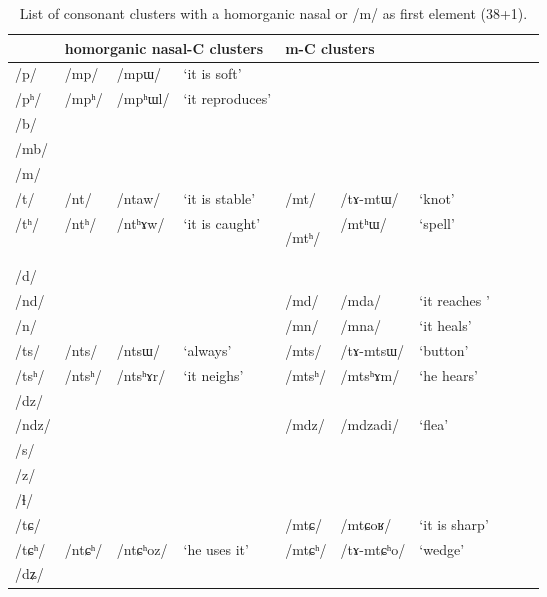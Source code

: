 \documentclass[12pt]{article}
\newcommand{\ipa}[1]{\mbox{\phon/#1/}}
\newcommand{\ipab}[1]{{\phon#1}}
\newcommand{\deux}[1]{\ipa{#1}\addtocounter{2clusters}{1}}
\newcommand{\tib}[1]{\cellcolor{lightgray}\textbf{#1}}
\begin{document}
 \begin{table}
 \caption{List of consonant clusters with a homorganic nasal or \ipa{m} as first element (38+1).} \label{prein.nasal}  
\begin{tabular}{llllllllll}
\toprule
 & \multicolumn{3}{l}{homorganic nasal-C clusters} & \multicolumn{3}{l}{\ipab{m}-C clusters}  \\
\midrule
\ipa{p}  & 	 \deux{mp}  & 	 \ipa{mpɯ}  & 	 `it is soft'  & 	  & 	  & 	 \\  
\ipa{pʰ}  & 	 \deux{mpʰ}  & 	 \ipa{mpʰɯl}  & 	 `it reproduces'  & 	  & 	  & 	 \\  
\ipa{b}  & 	  & 	  & 	  & 	  & 	  & 	 \\  
\ipa{mb}  & 	  & 	  & 	  & 	  & 	  & 	 \\  
\ipa{m}  & 	  & 	  & 	  & 	  & 	  & 	 \\  
\ipa{t}  & 	 \deux{nt}  & 	 \ipa{ntaw}  & 	 `it is stable'  & 	 \deux{mt}  & 	 \ipa{tɤ-mtɯ}  & 	 `knot' \\  
\ipa{tʰ}  & 	 \deux{ntʰ}  & 	 \ipa{ntʰɤw}  & 	 `it is caught'  & 	 \deux{mtʰ}\tib{}  & 	 \ipa{mtʰɯ}  & 	 `spell' \\  
\ipa{d}  & 	  & 	  & 	  & 	  & 	  & 	 \\  
\ipa{nd}  & 	  & 	  & 	  & 	 \deux{md}  & 	 \ipa{mda}  & 	 `it reaches ' \\  
\ipa{n}  & 	  & 	  & 	  & 	 \deux{mn}  & 	 \ipa{mna}  & 	 `it heals' \\  
\ipa{ts}  & 	 \deux{nts}  & 	 \ipa{ntsɯ}  & 	 `always'  & 	 \deux{mts}  & 	 \ipa{tɤ-mtsɯ}  & 	 `button' \\  
\ipa{tsʰ}  & 	 \deux{ntsʰ}  & 	 \ipa{ntsʰɤr}  & 	 `it neighs'  & 	 \deux{mtsʰ}  & 	 \ipa{mtsʰɤm}  & 	 `he hears' \\  
\ipa{dz}  & 	  & 	  & 	  & 	  & 	  & 	 \\  
\ipa{ndz}  & 	  & 	  & 	  & 	 \deux{mdz}  & 	 \ipa{mdzadi}  & 	 `flea' \\  
\ipa{s}  & 	  & 	  & 	  & 	  & 	  & 	 \\  
\ipa{z}  & 	  & 	  & 	  & 	  & 	  & 	 \\  
\ipa{ɬ}  & 	  & 	  & 	  & 	  & 	  & 	 \\  
\ipa{tɕ}  & 	  & 	  & 	  & 	 \deux{mtɕ}  & 	 \ipa{mtɕoʁ}  & 	 `it is sharp' \\  
\ipa{tɕʰ}  & 	 \deux{ntɕʰ}  & 	 \ipa{ntɕʰoz}  & 	 `he uses it'  & 	 \deux{mtɕʰ}  & 	 \ipa{tɤ-mtɕʰo}  & 	 `wedge' \\  
\ipa{dʑ}  & 	  & 	  & 	  & 	  & 	  & 	 \\  

\end{tabular}
\end{table}
\end{document}
